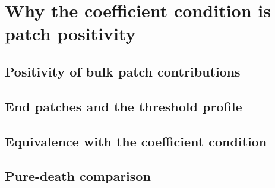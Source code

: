 \section{Why the coefficient condition is patch positivity}
\label{sec:patch-positivity}

\subsection{Positivity of bulk patch contributions}

\subsection{End patches and the threshold profile}

\subsection{Equivalence with the coefficient condition}

\subsection{Pure-death comparison}

